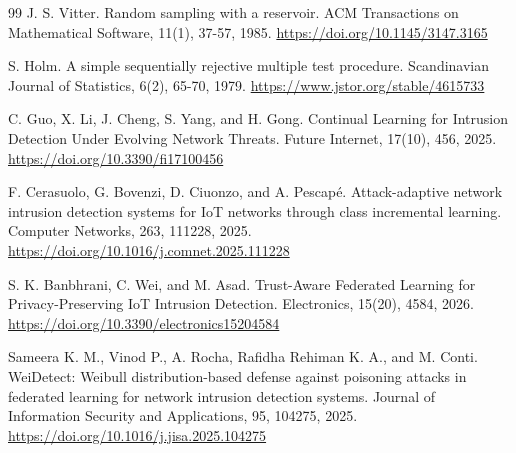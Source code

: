 \documentclass[
  10pt,
  a4paper,
]{article}
\begin{document}
\begin{thebibliography}{99}
 J. S. Vitter. Random sampling with a reservoir. ACM Transactions on Mathematical Software, 11(1), 37-57, 1985. \url{https://doi.org/10.1145/3147.3165}

 S. Holm. A simple sequentially rejective multiple test procedure. Scandinavian Journal of Statistics, 6(2), 65-70, 1979. \url{https://www.jstor.org/stable/4615733}

 C. Guo, X. Li, J. Cheng, S. Yang, and H. Gong. Continual Learning for Intrusion Detection Under Evolving Network Threats. Future Internet, 17(10), 456, 2025. \url{https://doi.org/10.3390/fi17100456}

 F. Cerasuolo, G. Bovenzi, D. Ciuonzo, and A. Pescap{\'e}. Attack-adaptive network intrusion detection systems for IoT networks through class incremental learning. Computer Networks, 263, 111228, 2025. \url{https://doi.org/10.1016/j.comnet.2025.111228}

 S. K. Banbhrani, C. Wei, and M. Asad. Trust-Aware Federated Learning for Privacy-Preserving IoT Intrusion Detection. Electronics, 15(20), 4584, 2026. \url{https://doi.org/10.3390/electronics15204584}

 Sameera K. M., Vinod P., A. Rocha, Rafidha Rehiman K. A., and M. Conti. WeiDetect: Weibull distribution-based defense against poisoning attacks in federated learning for network intrusion detection systems. Journal of Information Security and Applications, 95, 104275, 2025. \url{https://doi.org/10.1016/j.jisa.2025.104275}
\end{thebibliography}
\end{document}
